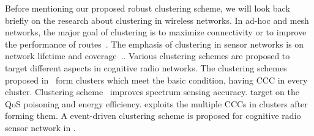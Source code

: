 \documentclass[10pt,journal,compsoc]{IEEEtran}
\theoremstyle{mytheoremstyle}
\theoremstyle{mytheoremstyle}
\theoremstyle{mytheoremstyle}
\begin{document}
Before mentioning our proposed robust clustering scheme, we will look back briefly on the research about clustering in wireless networks.
In ad-hoc and mesh networks, the major goal of clustering is to maximize connectivity or to improve the performance of routes~\cite{Kawadia03, clustering_mesh_globecom2010}.
The emphasis of clustering in sensor networks is on network lifetime and coverage~\cite{Abbasi_survey_07}..
Various clustering schemes are proposed to target different aspects in cognitive radio networks.
The clustering schemes proposed in~\cite{Zhao07, Chen07,Affinity_clustering_09icccn} form clusters which meet the basic condition, having CCC in every cluster.
Clustering scheme~\cite{Consensus_based_clustering12} improves spectrum sensing accuracy.
\cite{clustering_globecom11, TWC2012_cooperative_communication} target on the QoS poisoning and energy efficiency.
\cite{cluster_EW10} exploits the multiple CCCs in clusters after forming them.
A event-driven clustering scheme is proposed for cognitive radio sensor network in \cite{Ozger_cluster_crsn_13}.
\end{document}
